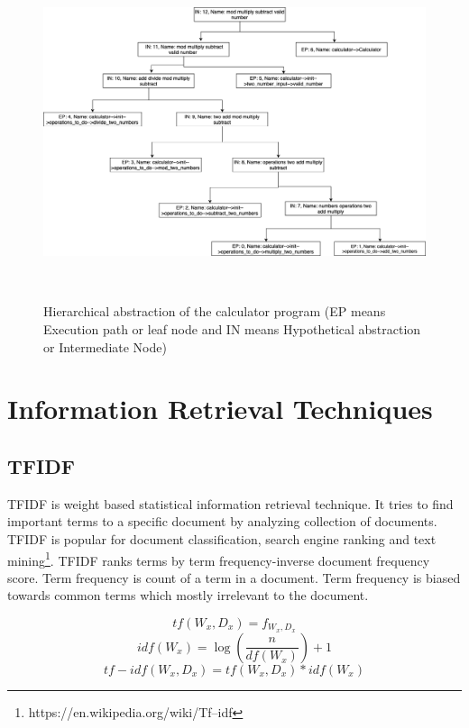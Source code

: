\begin{figure}[tb]
  \centering
  \includegraphics[width=\columnwidth]{figures/hla2/motivation_n.png}
  \caption{Hierarchical abstraction of the calculator program (EP means Execution path or leaf node and IN means Hypothetical abstraction or Intermediate Node)}~\label{fig:motivation}
\end{figure}



\section{Information Retrieval Techniques}
\subsection{TFIDF}
TFIDF is weight based statistical information retrieval technique. It tries to find important terms to a specific document by analyzing collection of documents. TFIDF is popular for document classification, search engine ranking and text mining\footnote{https://en.wikipedia.org/wiki/Tf–idf}. TFIDF ranks terms by term frequency-inverse document frequency score. Term frequency is count of a term in a document. Term frequency is biased towards common terms which mostly irrelevant to the document. 

\begin{equation}
    tf (W_x, D_x) = f_{W_x,D_x}
    \label{eq:tf_background}
\end{equation}
\begin{equation}
    idf(W_x) = \log(\frac{n}{df(W_x)})+1
    \label{eq:idf_background}
\end{equation}
\begin{equation}
    tf-idf(W_x, D_x) = tf(W_x,D_x) * idf(W_x)
    \label{eq:TFIDF_background}
\end{equation}



